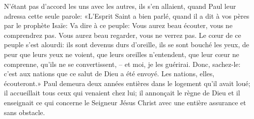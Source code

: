 N’étant pas d’accord les uns avec les autres, ils s’en allaient,
	quand Paul leur adressa cette seule parole:
	«L’Esprit Saint a bien parlé,
	quand il a dit à vos pères par le prophète Isaïe:
	Va dire à ce peuple: Vous aurez beau écouter, vous ne comprendrez pas.
	Vous aurez beau regarder, vous ne verrez pas.
Le cœur de ce peuple s’est alourdi:
	ils sont devenus durs d’oreille, ils se sont bouché les yeux,
	de peur que leurs yeux ne voient, que leurs oreilles n’entendent,
	que leur cœur ne comprenne, qu’ils ne se convertissent,
	– et moi, je les guérirai.
Donc, sachez-le: c’est aux nations que ce salut de Dieu a été envoyé.
	Les nations, elles, écouteront.»
Paul demeura deux années entières dans le logement qu’il avait loué;
	il accueillait tous ceux qui venaient chez lui;
	il annonçait le règne de Dieu
	et il enseignait ce qui concerne le Seigneur Jésus Christ
	avec une entière assurance et sans obstacle.
